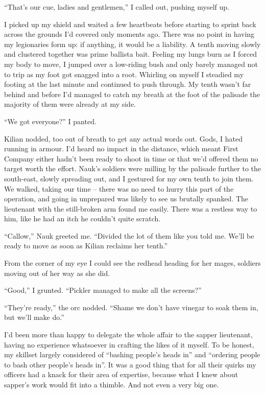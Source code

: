 \documentclass[12pt, openany]{book}
\begin{document}
“That’s our cue, ladies and gentlemen,” I called out, pushing myself up.

I picked up my shield and waited a few heartbeats before starting to sprint back across the grounds I’d covered only moments ago. There was no point in having my legionaries form up: if anything, it would be a liability. A tenth moving slowly and clustered together was prime ballista bait. Feeling my lungs burn as I forced my body to move, I jumped over a low-riding bush and only barely managed not to trip as my foot got snagged into a root. Whirling on myself I steadied my footing at the last minute and continued to push through. My tenth wasn’t far behind and before I’d managed to catch my breath at the foot of the palisade the majority of them were already at my side.

“We got everyone?” I panted.

Kilian nodded, too out of breath to get any actual words out. Gods, I hated running in armour. I’d heard no impact in the distance, which meant First Company either hadn’t been ready to shoot in time or that we’d offered them no target worth the effort. Nauk’s soldiers were milling by the palisade further to the south-east, slowly spreading out, and I gestured for my own tenth to join them. We walked, taking our time – there was no need to hurry this part of the operation, and going in unprepared was likely to see us brutally spanked. The lieutenant with the still-broken arm found me easily. There was a restless way to him, like he had an itch he couldn’t quite scratch.

“Callow,” Nauk greeted me. “Divided the lot of them like you told me. We’ll be ready to move as soon as Kilian reclaims her tenth.”

From the corner of my eye I could see the redhead heading for her mages, soldiers moving out of her way as she did.

“Good,” I grunted. “Pickler managed to make all the screens?”

“They’re ready,” the orc nodded. “Shame we don’t have vinegar to soak them in, but we’ll make do.”

I’d been more than happy to delegate the whole affair to the sapper lieutenant, having no experience whatsoever in crafting the likes of it myself. To be honest, my skillset largely considered of “bashing people’s heads in” and “ordering people to bash other people’s heads in”. It was a good thing that for all their quirks my officers had a knack for their area of expertise, because what I knew about sapper’s work would fit into a thimble. And not even a very big one.
\end{document}
